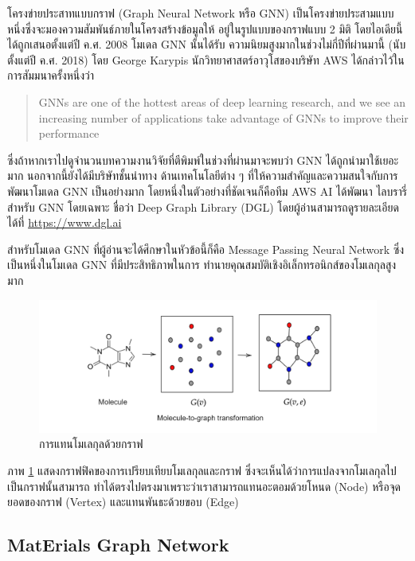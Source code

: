 โครงข่ายประสาทแบบกราฟ (Graph Neural Network หรือ GNN) เป็นโครงข่ายประสามแบบหนึ่งซึ่งจะมองความสัมพันธ์ภายในโครงสร้างข้อมูลให้%
อยู่ในรูปแบบของกราฟแบบ 2 มิติ โดยไอเดียนี้ได้ถูกเสนอตั้งแต่ปี ค.ศ. 2008\autocite{scarselli2009,zhou2020} โมเดล GNN นั้นได้รับ%
ความนิยมสูงมากในช่วงไม่กี่ปีที่ผ่านมานี้ (นับตั้งแต่ปี ค.ศ. 2018) โดย George Karypis นักวิทยาศาสตร์อาวุโสของบริษัท AWS ได้กล่าวไว้ใน%
การสัมมนาครั้งหนึ่งว่า 

\blockquote{GNNs are one of the hottest areas of deep learning research, and we see an increasing number of 
applications take advantage of GNNs to improve their performance}

\noindent ซึ่งถ้าหากเราไปดูจำนวนบทความงานวิจัยที่ตีพิมพ์ในช่วงที่ผ่านมาจะพบว่า GNN ได้ถูกนำมาใช้เยอะมาก นอกจากนี้ยังได้มีบริษัทชั้นนำทาง%
ด้านเทคโนโลยีต่าง ๆ ที่ให้ความสำคัญและความสนใจกับการพัฒนาโมเดล GNN เป็นอย่างมาก โดยหนึ่งในตัวอย่างที่ชัดเจนก็คือทีม AWS AI ได้พัฒนา%
ไลบรารี่สำหรับ GNN โดยเฉพาะ ชื่อว่า Deep Graph Library (DGL) โดยผู้อ่านสามารถดูรายละเอียดได้ที่ \url{https://www.dgl.ai}

สำหรับโมเดล GNN ที่ผู้อ่านจะได้ศึกษาในหัวข้อนี้ก็คือ Message Passing Neural Network ซึ่งเป็นหนึ่งในโมเดล GNN ที่มีประสิทธิภาพในการ%
ทำนายคุณสมบัติเชิงอิเล็กทรอนิกส์ของโมเลกุลสูงมาก

\begin{figure}[htbp]
    \centering
    \includegraphics[width=\linewidth]{fig/mol-2-graph.png}
    \caption{การแทนโมเลกุลด้วยกราฟ}
    \label{fig:mol_2_graph}
\end{figure}

ภาพ \ref{fig:mol_2_graph} แสดงกราฟฟิคของการเปรียบเทียบโมเลกุลและกราฟ ซึ่งจะเห็นได้ว่าการแปลงจากโมเลกุลไปเป็นกราฟนั้นสามารถ%
ทำได้ตรงไปตรงมาเพราะว่าเราสามารถแทนอะตอมด้วยโหนด (Node) หรือจุดยอดของกราฟ (Vertex) และแทนพันธะด้วยขอบ (Edge)

\subsection{MatErials Graph Network}
\label{ssec:megnet}

